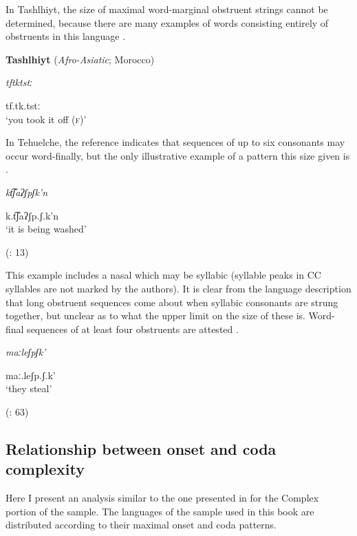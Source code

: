   In Tashlhiyt, the size of maximal word-marginal obstruent strings cannot be determined, because there are many examples of words consisting entirely of obstruents in this language . 

\ea\label{ex:3.12}
  \textbf{Tashlhiyt} (\textit{Afro-Asiatic}; Morocco)

\textit{tftktstː}

tf.tk.tstː\\
\glt ‘you took it off (\textsc{f})’
\citep[332]{Ridouane2008}
\z

In Tehuelche, the reference indicates that sequences of up to six consonants may occur word-finally, but the only illustrative example of a pattern this size given is .

\ea\label{ex:3.13}

\textit{kt͡ʃaʔʃpʃk’n}

k.t͡ʃaʔʃp.ʃ.k’n\\
\glt ‘it is being washed’

(\citealt{FernándezGarayHernández2006}: 13)
\z

This example includes a nasal which may be syllabic (syllable peaks in CC syllables are not marked by the authors). It is clear from the language description that long obstruent sequences come about when syllabic consonants are strung together, but unclear as to what the upper limit on the size of these is. Word-final sequences of at least four obstruents are attested .

\ea\label{ex:3.14}

\textit{maːleʃpʃk’}

maː.leʃp.ʃ.k’\\
\glt ‘they steal’

(\citealt{FernándezGarayHernández2006}: 63)
\z

\subsection{Relationship between onset and coda complexity}\label{sec:3.3.2}

  Here I present an analysis similar to the one presented in  for the Complex portion of the \citet{Maddieson2013a} sample. The languages of the sample used in this book are distributed according to their maximal onset and coda patterns.

